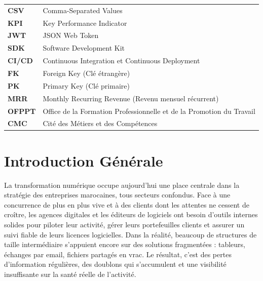 \documentclass[12pt, a4paper]{report}
\begin{document}
\begin{longtable}{@{}p{3cm}p{11.5cm}@{}}
\textbf{CSV}   & Comma-Separated Values \\[3pt]
\textbf{KPI}   & Key Performance Indicator \\[3pt]
\textbf{JWT}   & JSON Web Token \\[3pt]
\textbf{SDK}   & Software Development Kit \\[3pt]
\textbf{CI/CD} & Continuous Integration et Continuous Deployment \\[3pt]
\textbf{FK}    & Foreign Key (Clé étrangère) \\[3pt]
\textbf{PK}    & Primary Key (Clé primaire) \\[3pt]
\textbf{MRR}   & Monthly Recurring Revenue (Revenu mensuel récurrent) \\[3pt]
\textbf{OFPPT} & Office de la Formation Professionnelle et de la Promotion du Travail \\[3pt]
\textbf{CMC}   & Cité des Métiers et des Compétences \\[3pt]
\bottomrule
\end{longtable}

\cleardoublepage

\setcounter{page}{1}

\chapter*{Introduction Générale}

\vspace{0.5cm}

La transformation numérique occupe aujourd'hui une place centrale dans la
stratégie des entreprises marocaines, tous secteurs confondus. Face à une
concurrence de plus en plus vive et à des clients dont les attentes ne
cessent de croître, les agences digitales et les éditeurs de logiciels
ont besoin d'outils internes solides pour piloter leur activité, gérer
leurs portefeuilles clients et assurer un suivi fiable de leurs licences
logicielles. Dans la réalité, beaucoup de structures de taille
intermédiaire s'appuient encore sur des solutions fragmentées :
tableurs, échanges par email, fichiers partagés en vrac. Le résultat,
c'est des pertes d'information régulières, des doublons qui s'accumulent
et une visibilité insuffisante sur la santé réelle de l'activité.
\end{document}
